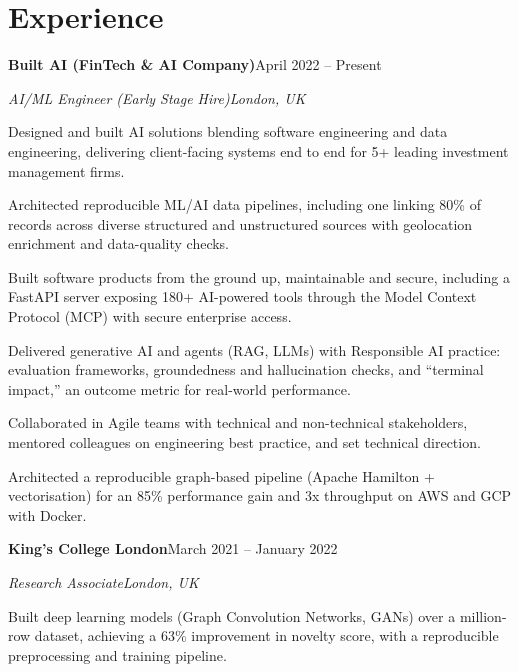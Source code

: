 \documentclass[10pt,a4paper]{article}
\newcommand{\entry}[4]{%
  {\color{company}\bfseries #1}\hfill {\color{muted}#2}\par
  \vspace{1pt}
  {\itshape #3}\hfill {\color{muted}\itshape #4}\par
  \vspace{3pt}%
}
\begin{document}
\section{Experience}
\entry{Built AI (FinTech \& AI Company)}{April 2022 -- Present}{AI/ML Engineer (Early Stage Hire)}{London, UK}
\begin{tight}
  \item Designed and built AI solutions blending software engineering and data engineering, delivering client-facing systems end to end for 5+ leading investment management firms.
  \item Architected reproducible ML/AI data pipelines, including one linking 80\% of records across diverse structured and unstructured sources with geolocation enrichment and data-quality checks.
  \item Built software products from the ground up, maintainable and secure, including a FastAPI server exposing 180+ AI-powered tools through the Model Context Protocol (MCP) with secure enterprise access.
  \item Delivered generative AI and agents (RAG, LLMs) with Responsible AI practice: evaluation frameworks, groundedness and hallucination checks, and ``terminal impact,'' an outcome metric for real-world performance.
  \item Collaborated in Agile teams with technical and non-technical stakeholders, mentored colleagues on engineering best practice, and set technical direction.
  \item Architected a reproducible graph-based pipeline (Apache Hamilton + vectorisation) for an 85\% performance gain and 3x throughput on AWS and GCP with Docker.
\end{tight}

\entry{King's College London}{March 2021 -- January 2022}{Research Associate}{London, UK}
\begin{tight}
  \item Built deep learning models (Graph Convolution Networks, GANs) over a million-row dataset, achieving a 63\% improvement in novelty score, with a reproducible preprocessing and training pipeline.
\end{tight}

\end{document}
